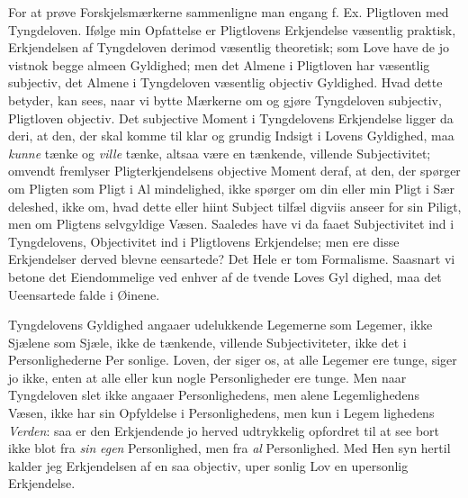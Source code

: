 \documentclass[12pt]{book}
\newcommand{\opage}[1]{\marginnote{\footnotesize\textit{[#1]}}}
\begin{document}
For at prøve Forskjelsmærkerne sammenligne man
engang f. Ex. Pligtloven med Tyngdeloven. Ifølge min
Opfattelse er Pligtlovens Erkjendelse væsentlig praktisk,
Erkjendelsen af Tyngdeloven derimod væsentlig theoretisk;
som Love have de jo vistnok begge almeen Gyldighed;
men det Almene i Pligtloven har væsentlig subjectiv, det
Almene i Tyngdeloven væsentlig objectiv Gyldighed.
Hvad dette betyder, kan sees, naar vi bytte Mærkerne
om og gjøre Tyngdeloven subjectiv, Pligtloven objectiv.
Det subjective Moment i Tyngdelovens Erkjendelse ligger
da deri, at den, der skal komme til klar og grundig
Indsigt i Lovens Gyldighed, maa \emph{kunne} tænke og \emph{ville}
tænke, altsaa være en tænkende, villende Subjectivitet;
omvendt fremlyser Pligterkjendelsens objective Moment
deraf, at den, der spørger om Pligten som Pligt i Al\-%
mindelighed, ikke spørger om din eller min Pligt i Sær\-%
deleshed, ikke om, hvad dette eller hiint Subject tilfæl\-%
digviis anseer for sin Piligt, men om Pligtens selvgyldige
Væsen. Saaledes have vi da faaet Subjectivitet ind i
Tyngdelovens, Objectivitet ind i Pligtlovens Erkjendelse;
men ere disse Erkjendelser derved blevne eensartede?
Det Hele er tom Formalisme. Saasnart vi betone
det Eiendommelige ved enhver af de tvende Loves Gyl\-%
dighed, maa det Ueensartede falde i Øinene.

Tyngdelovens Gyldighed angaaer udelukkende Legemerne
som Legemer, ikke Sjælene som Sjæle, ikke de tænkende,
villende Subjectiviteter, ikke det i Personlighederne Per\-%
\opage{28}\setcounter{footnote}{0}%
sonlige. Loven, der siger os, at alle Legemer ere tunge,
siger jo ikke, enten at alle eller kun nogle Personligheder
ere tunge. Men naar Tyngdeloven slet ikke angaaer
Personlighedens, men alene Legemlighedens Væsen, ikke
har sin Opfyldelse i Personlighedens, men kun i Legem\-%
lighedens \emph{Verden}: saa er den Erkjendende jo herved
udtrykkelig opfordret til at see bort ikke blot fra \emph{sin}
\emph{egen} Personlighed, men fra \emph{al} Personlighed. Med Hen\-%
syn hertil kalder jeg Erkjendelsen af en saa objectiv, uper\-%
sonlig Lov en upersonlig Erkjendelse.
\end{document}
